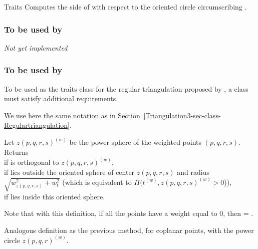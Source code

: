 \begin{ccClass}{Traits}
{Computes the side of  with respect to the oriented circle
circumscribing .
} 

\subsubsection{To be used by \protect 
{}}

\textit{Not yet implemented}

\subsubsection{To be used by \protect 
{}}

To be used as the traits class for the regular triangulation proposed
by \cgal, a class must satisfy additional requirements.

We use here the same notation as in
Section~\ref{Triangulation3-sec-class-Regulartriangulation}. 

{Let ${z(p,q,r,s)}^{(w)}$ be the power sphere of the weighted points 
$(p,q,r,s)$. Returns \\
 if  is orthogonal to
${z(p,q,r,s)}^{(w)}$,\\ 
 if  lies outside the oriented sphere of
center $z(p,q,r,s)$ and radius $\sqrt{ w_{z(p,q,r,s)}^2 + w_t^2 }$
(which is equivalent to $\Pi({t}^{(w)},{z(p,q,r,s)}^{(w)} >0$)),\\
 if  lies inside this oriented sphere.
}

Note that with this definition, if all the points have a weight equal
to 0, then
 = .

{Analogous definition as the previous method, for coplanar points,
with the power circle ${z(p,q,r)}^{(w)}$.
}


\end{ccClass}
